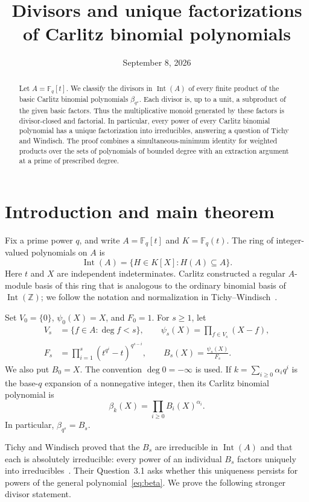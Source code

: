 \documentclass[11pt]{article}
\title{Divisors and unique factorizations of Carlitz binomial polynomials}
\author{}
\date{September 8, 2026}
\theoremstyle{remark}
\newcommand{\Int}{\operatorname{Int}}
\newcommand{\F}{\mathbb F}
\begin{document}
\maketitle
\begin{abstract}
Let $A=\F_q[t]$. We classify the divisors in $\Int(A)$ of every finite product of the basic Carlitz binomial polynomials $\beta_{q^s}$. Each divisor is, up to a unit, a subproduct of the given basic factors. Thus the multiplicative monoid generated by these factors is divisor-closed and factorial. In particular, every power of every Carlitz binomial polynomial has a unique factorization into irreducibles, answering a question of Tichy and Windisch. The proof combines a simultaneous-minimum identity for weighted products over the sets of polynomials of bounded degree with an extraction argument at a prime of prescribed degree.
\end{abstract}

\section{Introduction and main theorem}

Fix a prime power $q$, and write $A=\F_q[t]$ and $K=\F_q(t)$. The ring of integer-valued polynomials on $A$ is
\[
 \Int(A)=\{H\in K[X]:H(A)\subseteq A\}.
\]
Here $t$ and $X$ are independent indeterminates. Carlitz constructed a regular $A$-module basis of this ring that is analogous to the ordinary binomial basis of $\Int(\mathbb Z)$; we follow the notation and normalization in Tichy--Windisch~\cite{TW}.

Set $V_0=\{0\}$, $\psi_0(X)=X$, and $F_0=1$. For $s\geq1$, let
\begin{equation}\label{eq:def}
 \begin{split}
 V_s&=\{f\in A:\deg f<s\},\qquad
 \psi_s(X)=\prod_{f\in V_s}(X-f),\\
 F_s&=\prod_{i=1}^s(t^{q^i}-t)^{q^{s-i}},\qquad
 B_s(X)=\frac{\psi_s(X)}{F_s}.
 \end{split}
\end{equation}
We also put $B_0=X$. The convention $\deg0=-\infty$ is used. If $k=\sum_{i\geq0}\alpha_iq^i$ is the base-$q$ expansion of a nonnegative integer, then its Carlitz binomial polynomial is
\begin{equation}\label{eq:beta}
 \beta_k(X)=\prod_{i\geq0}B_i(X)^{\alpha_i}.
\end{equation}
In particular, $\beta_{q^s}=B_s$.

Tichy and Windisch proved that the $B_s$ are irreducible in $\Int(A)$ and that each is absolutely irreducible: every power of an individual $B_s$ factors uniquely into irreducibles~\cite[Theorem~1.2]{TW}. Their Question~3.1 asks whether this uniqueness persists for powers of the general polynomial~\eqref{eq:beta}. We prove the following stronger divisor statement.
\end{document}
